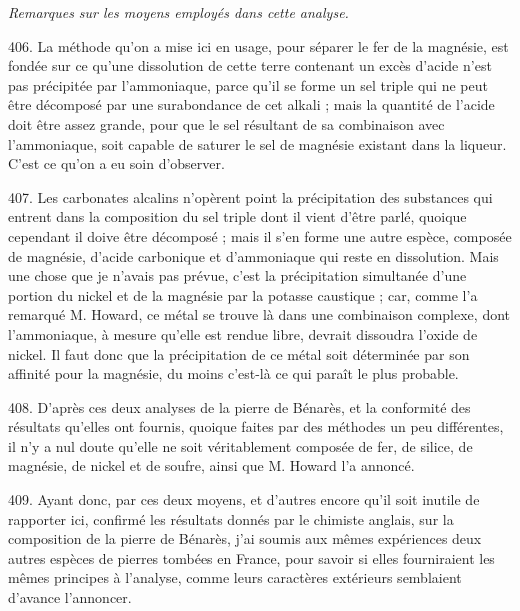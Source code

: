 \documentclass[a4paper, 11pt, oneside, polutonikogreek, french]{article}
\begin{document}
\begin{center}
\emph{Remarques sur les moyens employés dans cette analyse.}
\end{center}

406. La méthode qu'on a mise ici en usage, pour séparer le fer de la magnésie, est fondée sur ce qu'une dissolution de cette terre contenant un excès d'acide n'est pas précipitée par l'ammoniaque, parce qu'il se forme un sel triple qui ne peut être décomposé par une surabondance de cet alkali ; mais la quantité de l'acide doit être assez grande, pour que le sel résultant de sa combinaison avec l'ammoniaque, soit capable de saturer le sel de magnésie existant dans la liqueur. C'est ce qu'on a eu soin d'observer.

407. Les carbonates alcalins n'opèrent point la précipitation des substances qui entrent dans la composition du sel triple dont il vient d'être parlé, quoique cependant il doive être décomposé ; mais il s'en forme une autre espèce, composée de magnésie, d'acide carbonique et d'ammoniaque qui reste en dissolution. Mais une chose que je n'avais pas prévue, c'est la précipitation simultanée d'une portion du nickel et de la magnésie par la potasse caustique ; car, comme l'a remarqué M. Howard, ce métal se trouve là dans une combinaison complexe, dont l'ammoniaque, à mesure qu'elle est rendue libre, devrait dissoudra l'oxide de nickel. Il faut donc que la précipitation de ce métal soit déterminée par son affinité pour la magnésie, du moins c'est-là ce qui paraît le plus probable.

408. D'après ces deux analyses de la pierre de Bénarès, et la conformité des résultats qu'elles ont fournis, quoique faites par des méthodes un peu différentes, il n'y a nul doute qu'elle ne soit véritablement composée de fer, de silice, de magnésie, de nickel et de soufre, ainsi que M. Howard l'a annoncé.

409. Ayant donc, par ces deux moyens, et d'autres encore qu'il soit inutile de rapporter ici, confirmé les résultats donnés par le chimiste anglais, sur la composition de la pierre de Bénarès, j'ai soumis aux mêmes expériences deux autres espèces de pierres tombées en France, pour savoir si elles fourniraient les mêmes principes à l'analyse, comme leurs caractères extérieurs semblaient d'avance l'annoncer.
\end{document}
